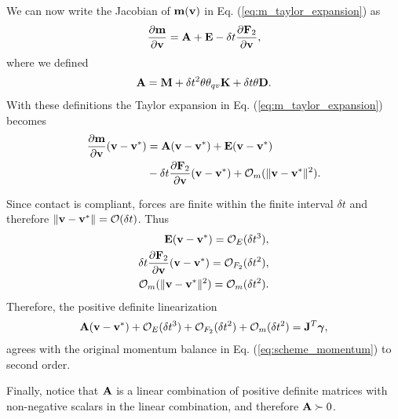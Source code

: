 We can now write the Jacobian of ${\mathbf{m}}({\mathbf{v}})$ in Eq.
(\ref{eq:m_taylor_expansion}) as
\begin{align*}
	\frac{\partial {\mathbf{m}}}{\partial {\mathbf{v}}} = {\mathbf{A}} + {\mathbf{E}} - \delta t\frac{\partial {\mathbf{F}}_2}{\partial {\mathbf{v}}},
\end{align*}
where we defined
\begin{align*}
	{\mathbf{A}}={\mathbf{M}}+ \delta t^2\theta\theta_{qv}{\mathbf{K}}+\delta t\theta{\mathbf{D}}.
\end{align*}
With these definitions the Taylor expansion in Eq. (\ref{eq:m_taylor_expansion})
becomes
\begin{align*}
	\frac{\partial{\mathbf{m}}}{\partial{\mathbf{v}}}({\mathbf{v}}-{\mathbf{v}}^*) &= {\mathbf{A}}({\mathbf{v}}-{\mathbf{v}}^*) + {\mathbf{E}}({\mathbf{v}}-{\mathbf{v}}^*) \\
	&- \delta t\frac{\partial{\mathbf{F}}_2}{\partial{\mathbf{v}}}({\mathbf{v}}-{\mathbf{v}}^*) + \mathcal{O}_m(\Vert{\mathbf{v}}-{\mathbf{v}}^*\Vert^2).
\end{align*}

Since contact is compliant, forces are finite within the finite interval $\delta
t$ and therefore $\Vert{\mathbf{v}}-{\mathbf{v}}^*\Vert=\mathcal{O}(\delta t)$. Thus
\begin{align*}
	{\mathbf{E}}({\mathbf{v}}-{\mathbf{v}}^*)=\mathcal{O}_E(\delta t^3), \\
    \delta t\frac{\partial {\mathbf{F}}_2}{\partial {\mathbf{v}}}({\mathbf{v}}-{\mathbf{v}}^*)=\mathcal{O}_{F_2}(\delta t^2), \\ 
    \mathcal{O}_m(\Vert{\mathbf{v}}-{\mathbf{v}}^*\Vert^2) = \mathcal{O}_m(\delta t^2).
\end{align*}
Therefore, the positive definite linearization
\begin{align*}
	{\mathbf{A}}({\mathbf{v}}-{\mathbf{v}}^*) + \mathcal{O}_E(\delta t^3) + \mathcal{O}_{F_2}(\delta t^2) +
	\mathcal{O}_m(\delta t^2) = {\mathbf{J}}^T{\mathbf{{\bm\gamma}}},
\end{align*}
agrees with the original momentum balance in Eq. (\ref{eq:scheme_momentum}) to second
order.

Finally, notice that ${\mathbf{A}}$ is a linear combination of positive definite
matrices with non-negative scalars in the linear combination, and therefore
${\mathbf{A}}\succ 0$.\hfill\IEEEQED
